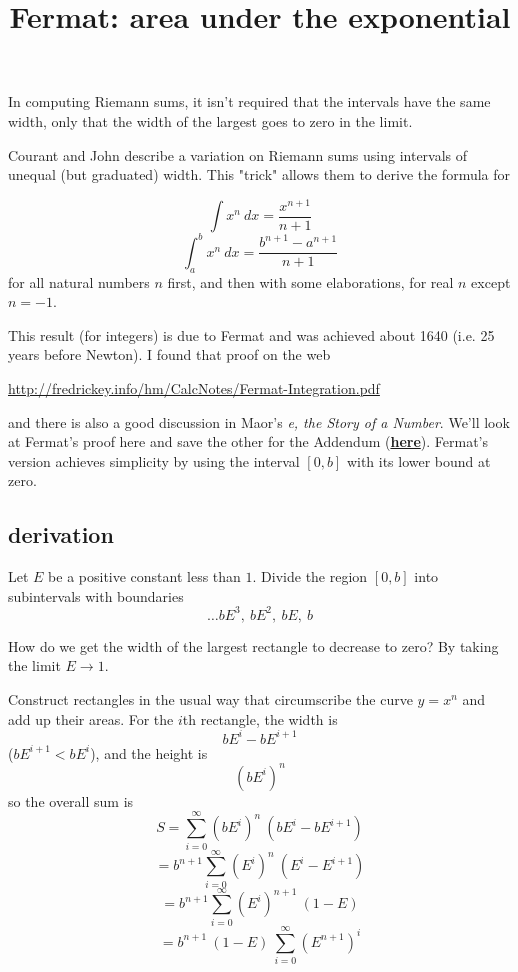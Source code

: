 \documentclass[11pt, oneside]{article}   	%
\title{Fermat:  area under the exponential}
\date{}
\begin{document}
\maketitle
\Large


In computing Riemann sums, it isn't required that the intervals have the same width, only that the width of the largest goes to zero in the limit.

Courant and John describe a variation on Riemann sums using intervals of unequal (but graduated) width.  This "trick" allows them to derive the formula for
 
\[ \int x^n \ dx = \frac{x^{n+1}}{n+1} \]
\[ \int_a^b x^n \ dx = \frac{b^{n+1} - a^{n+1}}{n+1} \]
for all natural numbers $n$ first, and then with some elaborations, for real $n$ except $n = -1$.

This result (for integers) is due to Fermat and was achieved about 1640 (i.e. 25 years before Newton).  I found that proof on the web

\url{http://fredrickey.info/hm/CalcNotes/Fermat-Integration.pdf}

and there is also a good discussion in Maor's \emph{e, the Story of a Number}.  We'll look at Fermat's proof here and save the other for the Addendum (\hyperref[sec:Courant_Riemann]{\textbf{here}}). Fermat's version achieves simplicity by using the interval $[0,b]$ with its lower bound at zero.

\subsection*{derivation}

Let $E$ be a positive constant less than $1$.  Divide the region $[0,b]$ into subintervals with boundaries 
\[ \dots bE^3, \ bE^2, \ bE, \ b \]

How do we get the width of the largest rectangle to decrease to zero?  By taking the limit $E \rightarrow 1$.

Construct rectangles in the usual way that circumscribe the curve $y = x^n$ and add up their areas.  For the $i$th rectangle, the width is
\[ bE^i - bE^{i+1} \]
($bE^{i+1} < bE^i$), and the height is
\[ (bE^i)^n \]
so the overall sum is
\[ S = \sum_{i = 0}^{\infty} (bE^i)^n \ (bE^i - bE^{i+1}) \]
\[ = b^{n+1} \sum_{i = 0}^{\infty} (E^i)^n \ (E^i - E^{i+1}) \]
\[ = b^{n+1} \sum_{i = 0}^{\infty} (E^i)^{n+1} \ (1 - E) \]
\[ = b^{n+1} \ (1 - E) \ \sum_{i = 0}^{\infty} (E^{n+1})^i \]
\end{document}
